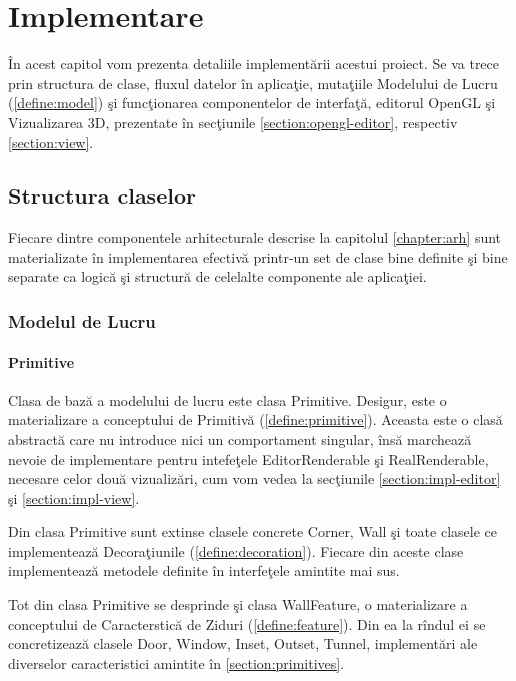 \chapter{Implementare}
\label{chapter:impl}

În acest capitol vom prezenta detaliile implementării acestui proiect. Se va 
trece prin structura de clase, fluxul datelor în aplicaţie, mutaţiile Modelului 
de Lucru (\ref{define:model})  şi funcţionarea componentelor de interfaţă,
editorul OpenGL şi Vizualizarea 3D, prezentate în secţiunile
\ref{section:opengl-editor}, respectiv \ref{section:view}.

\section{Structura claselor}

Fiecare dintre componentele arhitecturale descrise la capitolul 
\ref{chapter:arh} sunt materializate în implementarea efectivă printr-un set de 
clase bine definite şi bine separate ca logică şi structură de celelalte 
componente ale aplicaţiei.

\subsection{Modelul de Lucru}

\subsubsection{Primitive}
Clasa de bază a modelului de lucru este clasa Primitive. Desigur, este o
materializare a conceptului de Primitivă (\ref{define:primitive}). Aceasta este o clasă 
abstractă care nu introduce nici un comportament singular, însă marchează 
nevoie de implementare pentru intefeţele EditorRenderable şi RealRenderable, 
necesare celor două vizualizări, cum vom vedea la secţiunile 
\ref{section:impl-editor} şi \ref{section:impl-view}.

Din clasa Primitive sunt extinse clasele concrete Corner, Wall şi
toate clasele ce implementează Decoraţiunile (\ref{define:decoration}). Fiecare
din aceste clase implementează metodele definite în interfeţele amintite mai
sus.

Tot din clasa Primitive se desprinde şi clasa WallFeature, o materializare a
conceptului de Caracterstică de Ziduri (\ref{define:feature}). Din ea la rîndul
ei se concretizează clasele Door, Window, Inset, Outset, Tunnel, implementări
ale diverselor caracteristici amintite în \ref{section:primitives}.

